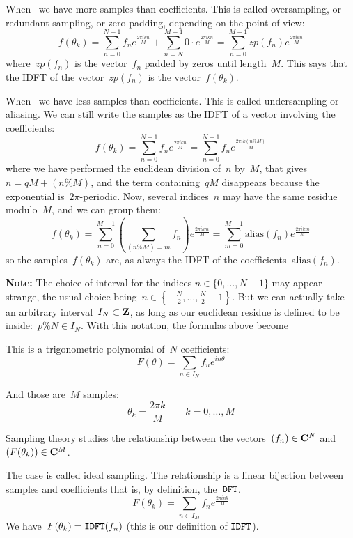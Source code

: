 \bigskip

When~ we have more samples than coefficients.  This is called
oversampling, or redundant sampling, or zero-padding, depending on the point of
view:
\[
	f(\theta_k)=\sum_{n=0}^{N-1} f_n e^{\frac{2\pi i k n}{M}}
	+\sum_{n=N}^{M-1} 0\cdot e^{\frac{2\pi i k n}{M}}
	=\sum_{n=0}^{M-1} zp(f_n) e^{\frac{2\pi i k n}{M}}
\]
where~$zp(f_n)$ is the vector~$f_n$ padded by zeros until length~$M$.
This says that the IDFT of the vector~$zp(f_n)$ is the vector~$f(\theta_k)$.


\bigskip

When~ we have less samples than coefficients.  This is called
undersampling or aliasing.  We can still write the samples as the IDFT of a
vector involving the coefficients:
\[
	f(\theta_k)
	=
	\sum_{n=0}^{N-1} f_n e^{\frac{2\pi i k n}{M}}
	=
	\sum_{n=0}^{N-1} f_n e^{\frac{2\pi i k (n\% M)}{M}}
\]
where we have performed the euclidean division of~$n$ by~$M$, that
gives~$n=qM+(n\% M)$, and the term containing~$qM$ disappears because the
exponential is~$2\pi$-periodic.  Now, several indices~$n$ may have the same
residue modulo~$M$, and we can group them:
\[
	f(\theta_k)
	=
	\sum_{n=0}^{M-1}\left(\sum_{(n\%M)=m}f_n\right) e^{\frac{2\pi i k m}{M}}
	=
	\sum_{m=0}^{M-1} \mathrm{alias}(f_n) e^{\frac{2\pi i k m}{M}}
\]
so the samples~$f(\theta_k)$ are, as always the IDFT of the
coefficients~$\mathrm{alias}(f_n)$.

\bigskip

{\bf Note:}
The choice of interval for the indices $n\in\{0,\ldots,N-1\}$ may appear
strange, the usual choice
being~$n\in\left\{-\frac{N}{2},\ldots,\frac{N}{2}-1\right\}$.
But we can actually take an arbitrary interval~$I_N\subset\mathbf{Z}$, as long as our
euclidean residue is defined to be inside:~$p\% N\in I_N$.  With this notation,
the formulas above become

\clearpage

This is a trigonometric polynomial of~$N$ coefficients:
\[
	F(\theta)=\sum_{n\in I_N}f_n e^{in\theta}
\]


And those are~$M$ samples:
\[
	\theta_k=\frac{2\pi k}{M} \qquad k=0,\ldots,M
\]

Sampling theory studies the relationship between the vectors~$(f_n)\in\mathbf{C}^N$
and~\mbox{$(F(\theta_k))\in\mathbf{C}^M$}.

\bigskip

The case  is called ideal sampling.  The relationship is a linear
bijection between samples and coefficients that is, by definition, the~$\mathtt{DFT}$.
\[
	F(\theta_k)=\sum_{n\in I_M}f_ne^{\frac{2\pi ink}{M}}
\]
We have~$F(\theta_k) = \mathtt{IDFT}(f_n)$ (this is our definition of $\mathtt{IDFT}$).

